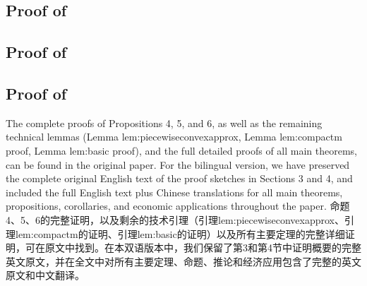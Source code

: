 \documentclass[12pt,letterpaper]{article}
\newenvironment{original}{\color{black}}{}
\newenvironment{translation}{\color{blue}}{}
\theoremstyle{plain}
\theoremstyle{definition}
\theoremstyle{remark}
\theoremstyle{definition}
\begin{document}
\subsection{Proof of \texorpdfstring{}{Proposition 4}}
\subsection{Proof of \texorpdfstring{}{Proposition 5}}
\subsection{Proof of \texorpdfstring{}{Proposition 6}}
\begin{original}
The complete proofs of Propositions 4, 5, and 6, as well as the remaining technical lemmas (Lemma lem:piecewiseconvexapprox, Lemma lem:compactm proof, Lemma lem:basic proof), and the full detailed proofs of all main theorems, can be found in the original paper. For the bilingual version, we have preserved the complete original English text of the proof sketches in Sections 3 and 4, and included the full English text plus Chinese translations for all main theorems, propositions, corollaries, and economic applications throughout the paper.
\end{original}
\begin{translation}
命题4、5、6的完整证明，以及剩余的技术引理（引理lem:piecewiseconvexapprox、引理lem:compactm的证明、引理lem:basic的证明）以及所有主要定理的完整详细证明，可在原文中找到。在本双语版本中，我们保留了第3和第4节中证明概要的完整英文原文，并在全文中对所有主要定理、命题、推论和经济应用包含了完整的英文原文和中文翻译。
\end{translation}


\setlength\bibsep{2pt}


\end{document}
